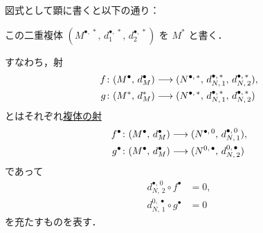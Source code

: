 \documentclass[algtopo_main]{subfiles}
\begin{document}
\begin{enumerate}
    図式として顕に書くと以下の通り：
    \begin{center}
    \end{center}
    この二重複体 $(M^{\bullet,\, *},\, d_1^{\bullet,\, *},\, d_2^{\bullet,\, *})$ を $M^*$ と書く．
\end{enumerate}
すなわち，射
\begin{align}
    f &\colon (M^\bullet,\, d_M^\bullet) \longrightarrow (N^{\bullet,\, *},\, d_{N,\, 1}^{\bullet,\, *},\, d_{N,\,2}^{\bullet,\, *}), \\
    g &\colon (M^*,\, d_M^*) \longrightarrow (N^{\bullet,\, *},\, d_{N,\, 1}^{\bullet,\, *},\, d_{N,\,2}^{\bullet,\, *})
\end{align}
とはそれぞれ\hyperref[def:chain-morphism]{複体の射}
\begin{align}
    f^\bullet &\colon (M^\bullet,\, d_M^\bullet) \longrightarrow (N^{\bullet,\, 0},\, d_{N,\, 1}^{\bullet,\, 0}), \\
    g^\bullet &\colon (M^\bullet,\, d_M^\bullet) \longrightarrow (N^{0,\, \bullet},\, d_{N,\,2}^{0,\, \bullet})
\end{align}
であって
\begin{align}
    d_{N,\, 2}^{\bullet,\, 0} \circ f^\bullet &= 0, \\
    d_{N,\, 1}^{0,\, \bullet} \circ g^\bullet &= 0
\end{align}
を充たすものを表す．
\end{document}
